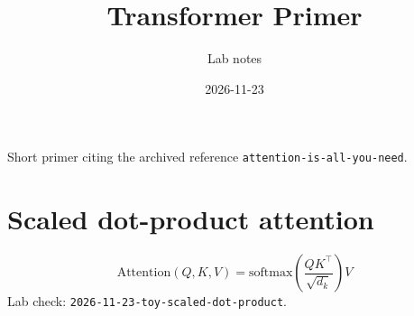 \documentclass[11pt]{article}
\title{Transformer Primer}
\author{Lab notes}
\date{2026-11-23}
\begin{document}
\maketitle

\noindent Short primer citing the archived reference \texttt{attention-is-all-you-need}.

\section{Scaled dot-product attention}
\[
\mathrm{Attention}(Q,K,V)=\mathrm{softmax}\!\left(\frac{QK^\top}{\sqrt{d_k}}\right)V
\]
Lab check: \texttt{2026-11-23-toy-scaled-dot-product}.
\end{document}
